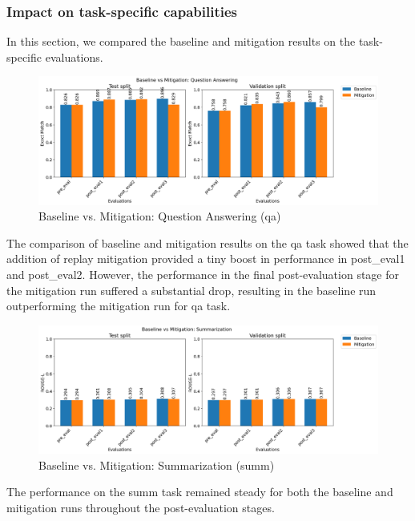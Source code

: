 \subsubsection{Impact on task-specific capabilities}
In this section, we compared the baseline and mitigation results on the task-specific evaluations.
\begin{figure}[H]
    \centering
    \includegraphics[width=1.1\textwidth]{Figures/results/trace_comparisons/task_eval/comparison_task_qa.png} 
    \caption{Baseline vs. Mitigation: Question Answering (qa)}
    \label{fig:QAComparison}
\end{figure}
The comparison of baseline and mitigation results on the qa task showed that the addition of replay mitigation provided a tiny boost in performance in post\_eval1 and post\_eval2. However, the performance in the final post-evaluation stage for the mitigation run suffered a substantial drop, resulting in the baseline run outperforming the mitigation run for qa task.

\begin{figure}[H]
    \centering
    \includegraphics[width=1.1\textwidth]{Figures/results/trace_comparisons/task_eval/comparison_task_summ.png} 
    \caption{Baseline vs. Mitigation: Summarization (summ)}
    \label{fig:SummComparison}
\end{figure}
The performance on the summ task remained steady for both the baseline and mitigation runs throughout the post-evaluation stages.

